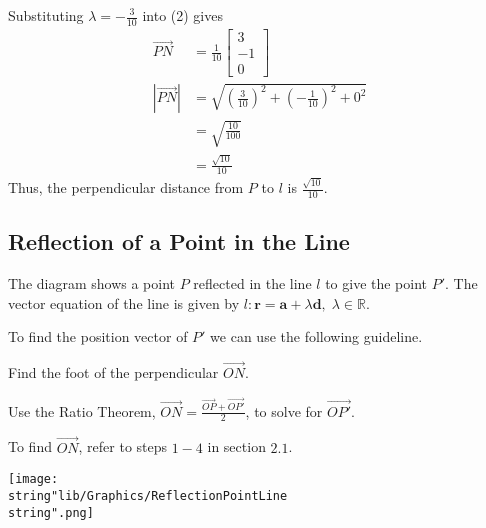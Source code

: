 \documentclass[11pt,a4paper]{book}
\newcommand{\R}{\mathbb{R}}
\begin{document}
\begin{example}
Substituting ${\displaystyle \lambda=-\frac{3}{10}}$ into (2) gives
\begin{align*}
\overrightarrow{PN} & =\frac{1}{10}\begin{bmatrix}3\\
-1\\
0
\end{bmatrix}\\
\left|\overrightarrow{PN}\right| & =\sqrt{\left(\frac{3}{10}\right)^{2}+\left(-\frac{1}{10}\right)^{2}+0^{2}}\\
 & =\sqrt{\frac{10}{100}}\\
 & =\frac{\sqrt{10}}{10}
\end{align*}
Thus, the perpendicular distance from $P$ to $l$ is ${\displaystyle \frac{\sqrt{10}}{10}}$.

\end{example}

\subsection{Reflection of a Point in the Line}

\begin{minipage}[t]{0.65\textwidth}

The diagram shows a point $P$ reflected in the line $l$ to give
the point $P'$. The vector equation of the line is given by $l:\textbf{r}=\textbf{a}+\lambda\textbf{d},\;\lambda\in\R$.

To find the position vector of $P'$ we can use the following guideline.

\begin{steps}[leftmargin=2cm]

\item  Find the foot of the perpendicular $\overrightarrow{ON}$.

\item  Use the Ratio Theorem, ${\displaystyle \overrightarrow{ON}=\frac{\overrightarrow{OP}+\overrightarrow{OP'}}{2}}$,
to solve for $\overrightarrow{OP'}$.

\end{steps}

To find $\overrightarrow{ON}$, refer to steps $1-4$ in section $2.1$.

\end{minipage}
\begin{minipage}[t]{0.1\textwidth}
\begin{center}
\texttt{[image: \\string"lib/Graphics/ReflectionPointLine\\string".png]}
\par\end{center}

\end{minipage}
\end{document}
